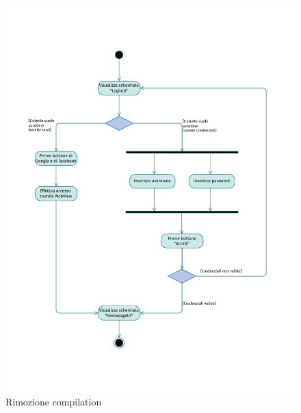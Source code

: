 \documentclass{natourDoc}
\begin{document}
	\newpage
	\begin{figure}[!htbp]
		\centering
		\includegraphics[width=\textwidth, page=7]{./diagrams/activity.pdf}
		\caption{Rimozione compilation}
	\end{figure}
	\FloatBarrier
\end{document}
